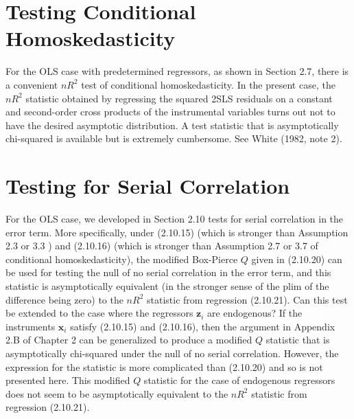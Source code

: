 \documentclass[10pt]{article}
\begin{document}
\section*{Testing Conditional Homoskedasticity}
For the OLS case with predetermined regressors, as shown in Section 2.7, there is a convenient $n R^{2}$ test of conditional homoskedasticity. In the present case, the $n R^{2}$ statistic obtained by regressing the squared 2SLS residuals on a constant and second-order cross products of the instrumental variables turns out not to have the desired asymptotic distribution. A test statistic that is asymptotically chi-squared is available but is extremely cumbersome. See White (1982, note 2).

\section*{Testing for Serial Correlation}
For the OLS case, we developed in Section 2.10 tests for serial correlation in the error term. More specifically, under (2.10.15) (which is stronger than Assumption 2.3 or 3.3 ) and (2.10.16) (which is stronger than Assumption 2.7 or 3.7 of conditional homoskedasticity), the modified Box-Pierce $Q$ given in (2.10.20) can be used for testing the null of no serial correlation in the error term, and this statistic is asymptotically equivalent (in the stronger sense of the plim of the difference being zero) to the $n R^{2}$ statistic from regression (2.10.21). Can this test be extended to the case where the regressors $\mathbf{z}_{i}$ are endogenous? If the instruments $\mathbf{x}_{i}$ satisfy (2.10.15) and (2.10.16), then the argument in Appendix 2.B of Chapter 2 can be generalized to produce a modified $Q$ statistic that is asymptotically chi-squared under the null of no serial correlation. However, the expression for the statistic is more complicated than (2.10.20) and so is not presented here. This modified $Q$ statistic for the case of endogenous regressors does not seem to be asymptotically equivalent to the $n R^{2}$ statistic from regression (2.10.21).
\end{document}
